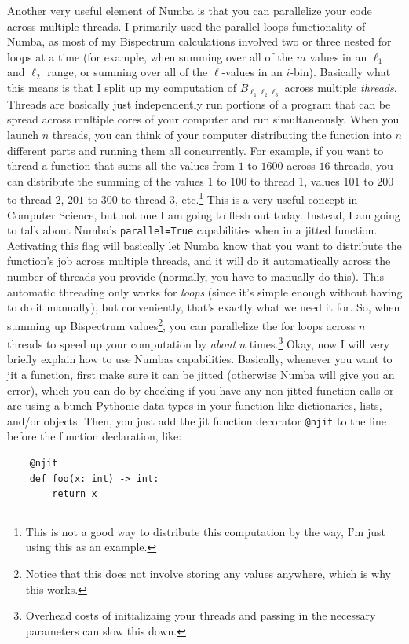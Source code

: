 \documentclass[11pt]{article}
\renewcommand{\_}[1]{\underline{ #1 }}
\newcommand{\npar}{\vspace{.3cm}\newline}
\begin{document}
{Another very useful element of Numba is that you can parallelize your code across multiple threads. I primarily used the parallel loops functionality of Numba, as most of my Bispectrum calculations involved two or three nested for loops at a time (for example, when summing over all of the $m$ values in an $\ell_1$ and $\ell_2$ range, or summing over all of the $\ell$-values in an $i$-bin). Basically what this means is that I split up my computation of $B_{\ell_1 \ell_2 \ell_3}$ across multiple \textit{threads}. Threads are basically just independently run portions of a program that can be spread across multiple cores of your computer and run simultaneously. When you launch $n$ threads, you can think of your computer distributing the function into $n$ different parts and running them all concurrently. For example, if you want to thread a function that sums all the values from $1$ to $1600$ across $16$ threads, you can distribute the summing of the values $1$ to $100$ to thread 1, values $101$ to $200$ to thread 2, $201$ to $300$ to thread 3, etc.\footnote{This is not a good way to distribute this computation by the way, I'm just using this as an example.} This is a very useful concept in Computer Science, but not one I am going to flesh out today. Instead, I am going to talk about Numba's \texttt{parallel=True} capabilities when in a jitted function. Activating this flag will basically let Numba know that you want to distribute the function's job across multiple threads, and it will do it automatically across the number of threads you provide (normally, you have to manually do this). This automatic threading only works for \textit{loops} (since it's simple enough without having to do it manually), but conveniently, that's exactly what we need it for. So, when summing up Bispectrum values\footnote{Notice that this does not involve storing any values anywhere, which is why this works.}, you can parallelize the for loops across $n$ threads to speed up your computation by \textit{about} $n$ times.\footnote{Overhead costs of initializaing your threads and passing in the necessary parameters can slow this down.}
\npar
Okay, now I will very briefly explain how to use Numbas capabilities. Basically, whenever you want to jit a function, first make sure it can be jitted (otherwise Numba will give you an error), which you can do by checking if you have any non-jitted function calls or are using a bunch Pythonic data types in your function like dictionaries, lists, and/or objects. Then, you just add the jit function decorator \texttt{@njit} to the line before the function declaration, like:
\begin{verbatim}
    @njit
    def foo(x: int) -> int:
        return x
\end{verbatim}

}
\end{document}
